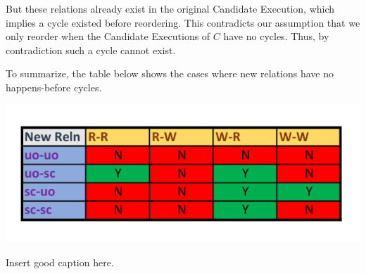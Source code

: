     But these relations already exist in the original Candidate Execution, which implies a cycle existed before reordering. This contradicts our assumption that we only reorder when the Candidate Executions of $C$ have no cycles. Thus, by contradiction such a cycle cannot exist.

    To summarize, the table below shows the cases where new relations have no happens-before cycles. 

    \begin{table}[H]
        \centering
        \includegraphics[scale=0.7]{5.InstructionReordering/4.ValidReorderingCandidate/ProofParts/Part3/part3_table.pdf}
        \caption{Insert good caption here.}
        \label{fig:my_label}
    \end{table}